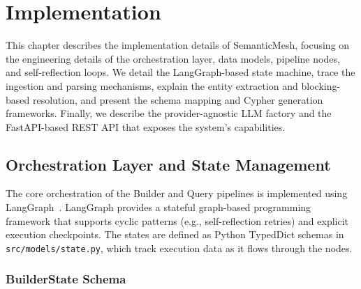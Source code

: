 \chapter{Implementation}
\label{ch:implementation}

This chapter describes the implementation details of SemanticMesh, focusing on the engineering details of the orchestration layer, data models, pipeline nodes, and self-reflection loops. We detail the LangGraph-based state machine, trace the ingestion and parsing mechanisms, explain the entity extraction and blocking-based resolution, and present the schema mapping and Cypher generation frameworks. Finally, we describe the provider-agnostic LLM factory and the FastAPI-based REST API that exposes the system's capabilities.

\section{Orchestration Layer and State Management}
\label{sec:imp:orchestration}

The core orchestration of the Builder and Query pipelines is implemented using LangGraph~\cite{langgraphdocs2025}. LangGraph provides a stateful graph-based programming framework that supports cyclic patterns (e.g., self-reflection retries) and explicit execution checkpoints. The states are defined as Python TypedDict schemas in \texttt{src/models/state.py}, which track execution data as it flows through the nodes.

\subsection{BuilderState Schema}
\label{sec:imp:builder_state}

